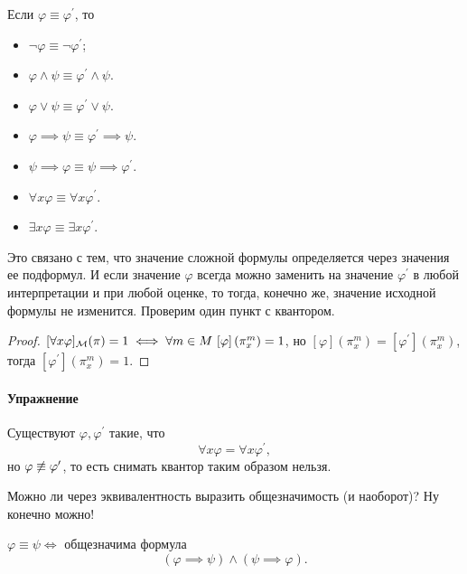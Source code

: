 \begin{lemma}
    Если $\varphi \equiv \varphi^{\prime}$, то
    \begin{itemize}
        \item $\neg \varphi \equiv \neg \varphi^{\prime}$;
        \item $\varphi \land \psi \equiv \varphi^{\prime} \land \psi$.
        \item $\varphi \lor \psi \equiv \varphi^{\prime} \lor \psi$.
        \item $\varphi \implies \psi \equiv \varphi^{\prime} \implies \psi$.
        \item $\psi \implies \varphi \equiv \psi \implies \varphi^{\prime}$.
        \item $\forall x \varphi \equiv \forall x \varphi^{\prime}$.
        \item $\exists x \varphi \equiv \exists x \varphi^{\prime}$.
    \end{itemize}
\end{lemma}

Это связано с тем, что значение сложной формулы определяется через значения ее подформул.
И если значение $\varphi$ всегда можно заменить на значение $\varphi^{\prime}$ в любой интерпретации и при любой оценке, то тогда, конечно же, значение исходной формулы не изменится.
Проверим один пункт с квантором.

\begin{proof}
    $[\forall x \varphi]_{\mathcal{M}}(\pi) = 1 \iff \forall m \in M~[\varphi]\left( \pi_{x}^{m} \right) = 1$, но $[\varphi]\left( \pi_{x}^{m} \right) = [\varphi^{\prime}]\left( \pi_{x}^{m} \right)$, тогда $[\varphi^{\prime}]\left( \pi_{x}^{m} \right) = 1$.
\end{proof}

\paragraph{Упражнение}
Существуют $\varphi, \varphi^{\prime}$ такие, что
$$
    \forall x \varphi = \forall x \varphi^{\prime},
$$
но $\varphi \centernot\equiv \varphi^{\prime}$, то есть снимать квантор таким образом нельзя.

Можно ли через эквивалентность выразить общезначимость (и наоборот)?
Ну конечно можно!

\begin{lemma}
    $\varphi \equiv \psi \iff $ общезначима формула
    $$
        (\varphi \implies \psi) \land (\psi \implies \varphi).
    $$
\end{lemma}

